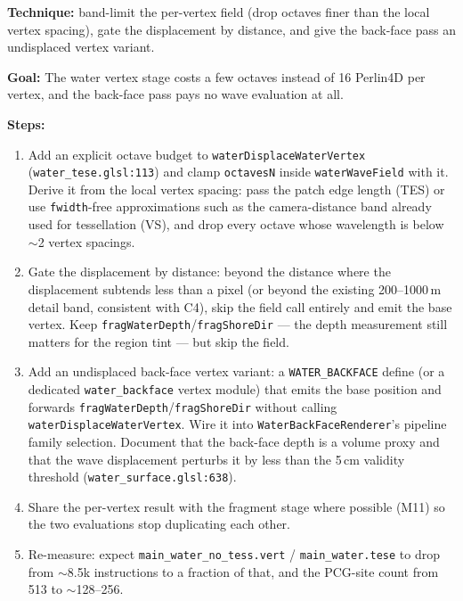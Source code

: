 \documentclass[11pt,a4paper]{article}
\begin{document}
\textbf{Technique:} band-limit the per-vertex field (drop octaves finer than the local vertex spacing), gate the
displacement by distance, and give the back-face pass an undisplaced vertex variant.

\begin{tcolorbox}[promptbox={Prompt: Band-Limit the Vertex Wave Evaluation and Stop Displacing Back Faces}]
\textbf{Goal:} The water vertex stage costs a few octaves instead of 16 Perlin4D per vertex, and the back-face pass pays
no wave evaluation at all.

\textbf{Steps:}
\begin{enumerate}
    \item Add an explicit octave budget to \texttt{waterDisplaceWaterVertex}
    (\texttt{water\_tese.glsl:113}) and clamp \texttt{octavesN} inside \texttt{waterWaveField} with it. Derive it from
    the local vertex spacing: pass the patch edge length (TES) or use \texttt{fwidth}-free approximations such as the
    camera-distance band already used for tessellation (VS), and drop every octave whose wavelength is below $\sim$2
    vertex spacings.
    \item Gate the displacement by distance: beyond the distance where the displacement subtends less than a pixel
    (or beyond the existing 200--1000\,m detail band, consistent with C4), skip the field call entirely and emit the
    base vertex. Keep \texttt{fragWaterDepth}/\texttt{fragShoreDir} --- the depth measurement still matters for the
    region tint --- but skip the field.
    \item Add an undisplaced back-face vertex variant: a \texttt{WATER\_BACKFACE} define (or a dedicated
    \texttt{water\_backface} vertex module) that emits the base position and forwards
    \texttt{fragWaterDepth}/\texttt{fragShoreDir} without calling \texttt{waterDisplaceWaterVertex}. Wire it into
    \texttt{WaterBackFaceRenderer}'s pipeline family selection. Document that the back-face depth is a volume proxy and
    that the wave displacement perturbs it by less than the 5\,cm validity threshold
    (\texttt{water\_surface.glsl:638}).
    \item Share the per-vertex result with the fragment stage where possible (M11) so the two evaluations stop
    duplicating each other.
    \item Re-measure: expect \texttt{main\_water\_no\_tess.vert} / \texttt{main\_water.tese} to drop from $\sim$8.5k
    instructions to a fraction of that, and the PCG-site count from 513 to $\sim$128--256.
\end{enumerate}


\end{tcolorbox}
\end{document}
